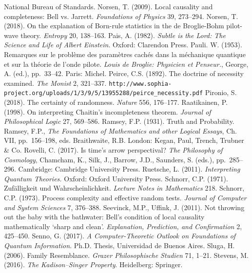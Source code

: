 \documentclass[11pt,a4paper]{article}
\numberwithin{equation}{section}
\begin{document}
\begin{small}
\begin{thebibliography}{99}
National Bureau of Standards.
\bibitem{}
 Norsen, T. (2009). Local causality and completeness: Bell vs. Jarrett. \emph{ Foundations of Physics} 39, 273--294.
          \bibitem{} Norsen, T. (2018). On the explanation of Born-rule statistics in the de Broglie-Bohm pilot-wave theory.
          \emph{Entropy} 20, 138--163. 
\bibitem{} Pais, A. (1982). \emph{Subtle is the Lord: The Science and Life of Albert Einstein}. Oxford: Clarendon Press.
\bibitem{} Pauli. W. (1953). Remarques sur le probl\`{e}me des param\`{e}tres cach\'{e}s dans la m\'{e}chanique quantique et sur la th\'{e}orie de l'onde pilote.
\emph{Louis de Broglie: Physicien et Penseur.}, 
George, A. (ed.), pp.\ 33--42.  Paris: Michel. 
\bibitem{} Peirce, C.S. (1892). The doctrine of necessity examined. \emph{The Monist} 2,  321--337.
\verb#http://www.sophia-project.org/uploads/1/3/9/5/13955288/peirce_necessity.pdf#
   \bibitem{}  Pironio, S. (2018). The certainty of randomness. \emph{Nature} 556, 176--177.  
    \bibitem{}    Raatikainen, P. (1998). On interpreting Chaitin's incompleteness theorem. \emph{Journal of Philosophical Logic} 27, 569--586.
   \bibitem{}  Ramsey, F.P.   (1931).  Truth  and  Probability.  Ramsey, F.P.,  \emph{The  Foundations  of   Mathematics  and  other  Logical  Essays},  Ch.  VII,  pp.\ 156--198,  eds.  Braithwaite, R.B.  London: Kegan, Paul, Trench, Trubner \& Co.
     \bibitem{} Rovelli, C. (2017). Is time's arrow perspectival? 
     \emph{The Philosophy of Cosmology}, Chamcham, K., Silk, J., Barrow, J.D., Saunders, S. (eds.),  
     pp.\ 285--296. Cambridge: Cambridge University Press.
  \bibitem{}   Ruetsche, L. (2011). \emph{Interpreting Quantum Theories.} Oxford: Oxford University Press.    
    \bibitem{}  Schnorr, C.P. (1971). {Zuf\"{a}lligkeit und Wahrscheinlichkeit}. \emph{Lecture Notes in Mathematics} 218. 
        \bibitem{}  Schnorr, C.P. (1973). Process complexity and effective random tests. \emph{Journal of Computer and System Sciences} 7, 376--388.
         \bibitem{}
Seevinck, M.P.,  Uffink, J. (2011). Not throwing out the baby with the bathwater: Bell's condition of local causality mathematically `sharp and clean'. \emph{Explanation, Prediction, and Confirmation}  2, 425--450.
        \bibitem{} Senno, G. (2017). \emph{A Computer-Theoretic Outlook on Foundations of Quantum Information}.
      Ph.D. Thesis, Universidad de Buenos Aires.  
    \bibitem{} Sluga, H. (2006). Family Resemblance. \emph{Grazer Philosophische Studien} 71, 1--21.  
  \bibitem{}Stevens, M. (2016). \emph{The Kadison--Singer Property}. Heidelberg: Springer.   

\end{thebibliography}
\end{small}
\end{document}
